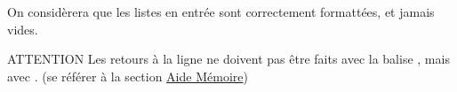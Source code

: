\noindent On considèrera que les listes en entrée sont correctement formattées, et jamais vides.

\bigskip

\begin{RedBoxTitle}{ATTENTION}
    Les retours à la ligne ne doivent pas être faits avec la balise , mais avec .
    (se référer à la section \hyperref[sec:AideMemoire]{Aide Mémoire})
\end{RedBoxTitle}

%
